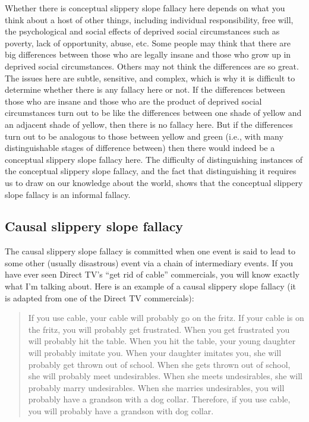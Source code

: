 Whether there is conceptual slippery slope fallacy here depends on what you think about a host of other things, including individual responsibility, free will, the psychological and social effects of deprived social circumstances such as poverty, lack of opportunity, abuse, etc. Some people may think that there are big differences between those who are legally insane and those who grow up in deprived social circumstances. Others may not think the differences are so great. The issues here are subtle, sensitive, and complex, which is why it is difficult to determine whether there is any fallacy here or not. If the differences between those who are insane and those who are the product of deprived social circumstances turn out to be like the differences between one shade of yellow and an adjacent shade of yellow, then there is no fallacy here. But if the differences turn out to be analogous to those between yellow and green (i.e., with many distinguishable stages of difference between) then there would indeed be a conceptual slippery slope fallacy here. The difficulty of distinguishing instances of the conceptual slippery slope fallacy, and the fact that distinguishing it requires us to draw on our knowledge about the world, shows that the conceptual slippery slope fallacy is an informal fallacy.

\subsection{Causal slippery slope fallacy}

The causal slippery slope fallacy is committed when one event is said to lead to some other (usually disastrous) event via a chain of intermediary events. If you have ever seen Direct TV's ``get rid of cable'' commercials, you will know exactly what I'm talking about.  Here is an example of a causal slippery slope fallacy (it is adapted from one of the Direct TV commercials):

\begin{quote}
If you use cable, your cable will probably go on the fritz. If your cable is on the fritz, you will probably get frustrated. When you get frustrated you will probably hit the table. When you hit the table, your young daughter will probably imitate you. When your daughter imitates you, she will probably get thrown out of school. When she gets thrown out of school, she will probably meet undesirables. When she meets undesirables, she will probably marry undesirables. When she marries undesirables, you will probably have a grandson with a dog collar. Therefore, if you use cable, you will probably have a grandson with dog collar.
\end{quote}

